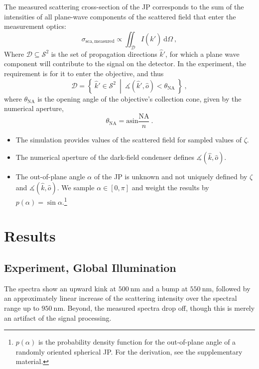 \documentclass[10pt]{article}
\begin{document}
\begin{multicols}{2}
The measured scattering cross-section of the JP corresponds to the sum of the intensities of all plane-wave components of the scattered field that enter the measurement optics:
$$\sigma_\mathrm{sca,measured} \propto \iint_{\mathcal{D}} I\left( \hat{k}' \right) ~\mathrm{d}\Omega\ ,$$
Where $\mathcal{D} \subseteq \mathcal{S}^2$ is the set of propagation directions $\hat{k}'$, for which a plane wave component will contribute to the signal on the detector. 
In the experiment, the requirement is for it to enter the objective, and thus
$$
    \mathcal{D} = \left\lbrace\ \hat{k}' \in \mathcal{S}^2\ \middle\vert\ \measuredangle\!\left( \hat{k}', \hat{o}\right) < \theta_\mathrm{NA}\ \right\rbrace
    \ ,
$$
where $\theta_\mathrm{NA}$ is the opening angle of the objective's collection cone, given by the numerical aperture,
$$\theta_\mathrm{NA} = \mathrm{asin}\frac{\mathrm{NA}}{n} \ .$$

\begin{itemize}
    \item The simulation provides values of the scattered field for sampled values of $\zeta$.
    \item The numerical aperture of the dark-field condenser defines $\measuredangle(\hat{k},\hat{o})$.
    \item The out-of-plane angle $\alpha$ of the JP is unknown and not uniquely defined by $\zeta$ and $\measuredangle(\hat{k},\hat{o})$. We sample $\alpha\in\left[0,\pi\right]$ and weight the results by $p(\alpha) = \sin\alpha$.\footnote{$p(\alpha)$ is the probability density function for the out-of-plane angle of a randomly oriented spherical JP. For the derivation, see the supplementary material.}
\end{itemize}









\section*{Results}


\subsection*{Experiment, Global Illumination}


The spectra show an upward kink at $\SI{500}{\nano\meter}$ and a bump at $\SI{550}{\nano\meter}$, followed by an approximately linear increase of the scattering intensity over the spectral range up to $\SI{950}{\nano\meter}$. 
Beyond, the measured spectra drop off, though this is merely an artifact of the signal processing. 


\end{multicols}
\end{document}
